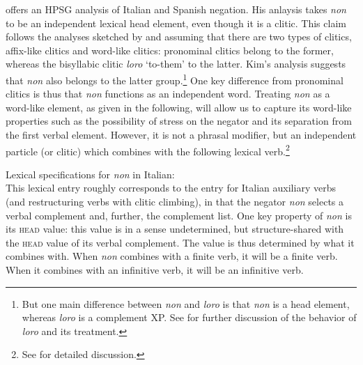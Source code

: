 \documentclass[output=paper
                ,modfonts
                ,nonflat
	        ,collection
	        ,collectionchapter
	        ,collectiontoclongg
 	        ,biblatex
                ,babelshorthands
                ,newtxmath
                ,draftmode
                ,colorlinks, citecolor=brown
]{./langsci/langscibook}
\begin{document}
{\begin{exe}
\begin{xlist}
\citet{Kim:00} offers an HPSG analysis of Italian and Spanish negation.
His anlaysis takes \textit{non}
to be an independent lexical head element, even though it is a clitic.
This claim follows the  analyses sketched by \citet{Monachesi:93} and \citet{Monachesi:98}
assuming that there are two types of clitics, affix-like
clitics and word-like clitics: pronominal clitics belong to the
former, whereas the bisyllabic clitic \textit{loro} `to-them' to the
latter. Kim's analysis suggests that \textit{non} also belongs
to the latter group.\footnote{But one main difference between
\textit{non} and \textit{loro} is that \textit{non} is a head
element, whereas \textit{loro} is a complement XP. See
\citet{Monachesi:98} for further discussion of the
behavior of \textit{loro} and its treatment.} One key difference from
pronominal clitics is thus that \textit{non} functions as an independent word.
Treating \textit{non} as
a word-like element, as given in the following, will allow us to capture its word-like
properties such as the possibility of stress on the negator and
its separation from the first verbal element. However, it is not a
phrasal modifier, but an independent particle (or clitic) which combines with
the following lexical  verb.\footnote{See \citet{Kim:00} for
detailed discussion.}

\ea
\label{negation-non}
Lexical specifications for \textit{non} in Italian:\\
\z
%
\noindent
This lexical entry roughly corresponds to the entry for
Italian auxiliary verbs (and restructuring verbs with clitic climbing),
in that the negator \textit{non} selects a verbal complement and, further, the
complement list. One key property of \textit{non}
is its \textsc{head} value: this value is in a sense undetermined, but structure-shared with the \textsc{head} value of its verbal complement.
The value is thus
determined by what it combines with. When \textit{non} combines with a finite
verb, it will be a finite verb. When it combines with an
infinitive verb, it will be an infinitive verb.


\end{xlist}
\end{exe}}
\end{document}
